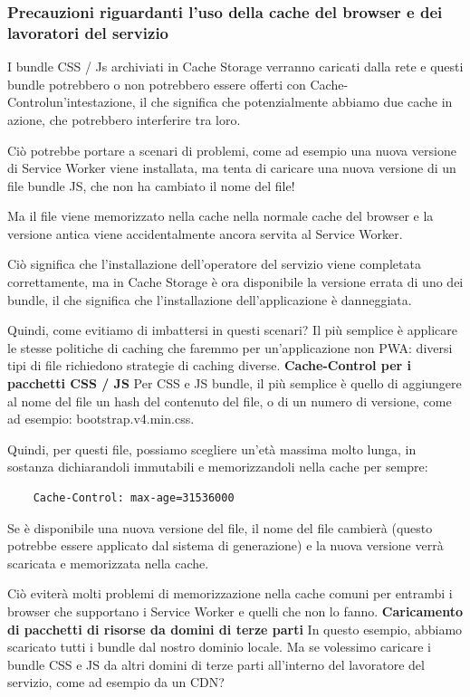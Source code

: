 \documentclass[italian]{article}
\begin{document}
\subsubsection{Precauzioni riguardanti l'uso della cache del browser e dei lavoratori del servizio}
I bundle CSS / Js archiviati in Cache Storage verranno caricati dalla rete e questi bundle potrebbero o non potrebbero essere offerti con Cache-Controlun'intestazione, il che significa che potenzialmente abbiamo due cache in azione, che potrebbero interferire tra loro.

Ciò potrebbe portare a scenari di problemi, come ad esempio una nuova versione di Service Worker viene installata, ma tenta di caricare una nuova versione di un file bundle JS, che non ha cambiato il nome del file!

Ma il file viene memorizzato nella cache nella normale cache del browser e la versione antica viene accidentalmente ancora servita al Service Worker.

Ciò significa che l'installazione dell'operatore del servizio viene completata correttamente, ma in Cache Storage è ora disponibile la versione errata di uno dei bundle, il che significa che l'installazione dell'applicazione è danneggiata.

Quindi, come evitiamo di imbattersi in questi scenari? Il più semplice è applicare le stesse politiche di caching che faremmo per un'applicazione non PWA: diversi tipi di file richiedono strategie di caching diverse.
\textbf{Cache-Control per i pacchetti CSS / JS}
Per CSS e JS bundle, il più semplice è quello di aggiungere al nome del file un hash del contenuto del file, o di un numero di versione, come ad esempio: bootstrap.v4.min.css.

Quindi, per questi file, possiamo scegliere un'età massima molto lunga, in sostanza dichiarandoli immutabili e memorizzandoli nella cache per sempre:
\begin{lstlisting}
	Cache-Control: max-age=31536000
\end{lstlisting}
Se è disponibile una nuova versione del file, il nome del file cambierà (questo potrebbe essere applicato dal sistema di generazione) e la nuova versione verrà scaricata e memorizzata nella cache.

Ciò eviterà molti problemi di memorizzazione nella cache comuni per entrambi i browser che supportano i Service Worker e quelli che non lo fanno.
\textbf{Caricamento di pacchetti di risorse da domini di terze parti}
In questo esempio, abbiamo scaricato tutti i bundle dal nostro dominio locale. Ma se volessimo caricare i bundle CSS e JS da altri domini di terze parti all'interno del lavoratore del servizio, come ad esempio da un CDN?
\end{document}
